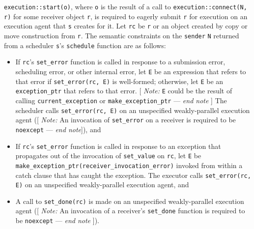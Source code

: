 \documentclass[a4paper,12pt,notitlepage,twoside,openright]{article}
\begin{document}
\texttt{execution::start(o)}, where \texttt{o}
is the result of a call to \texttt{execution::connect(N, r)}
for some receiver object \texttt{r}, is required to eagerly
submit \texttt{r} for execution on an execution agent that
\texttt{s} creates for it. Let \texttt{rc} be
\texttt{r} or an object created by copy or move construction
from \texttt{r}. The semantic constraints on the
\texttt{sender} \texttt{N} returned from a
scheduler \texttt{s}'s \texttt{schedule}
function are as follows:

\begin{itemize}
\item
  If \texttt{rc}'s \texttt{set_error} function
  is called in response to a submission error, scheduling error, or
  other internal error, let \texttt{E} be an expression that
  refers to that error if \texttt{set_error(rc, E)} is
  well-formed; otherwise, let \texttt{E} be an
  \texttt{exception_ptr} that refers to that error. {[}
  \emph{Note:} \texttt{E} could be the result of calling
  \texttt{current_exception} or
  \texttt{make_exception_ptr} --- \emph{end note} {]} The
  scheduler calls \texttt{set_error(rc, E)} on an
  unspecified weakly-parallel execution agent ({[} \emph{Note:} An
  invocation of \texttt{set_error} on a receiver is required
  to be \texttt{noexcept} --- \emph{end note}{]}), and
\item
  If \texttt{rc}'s \texttt{set_error} function
  is called in response to an exception that propagates out of the
  invocation of \texttt{set_value} on
  \texttt{rc}, let \texttt{E} be
  \texttt{make_exception_ptr(receiver_invocation_error{})}
  invoked from within a catch clause that has caught the exception. The
  executor calls \texttt{set_error(rc, E)} on an unspecified
  weakly-parallel execution agent, and
\item
  A call to \texttt{set_done(rc)} is made on an unspecified
  weakly-parallel execution agent ({[} \emph{Note:} An invocation of a
  receiver's \texttt{set_done} function is required to be
  \texttt{noexcept} --- \emph{end note} {]}).
\end{itemize}
\end{document}
